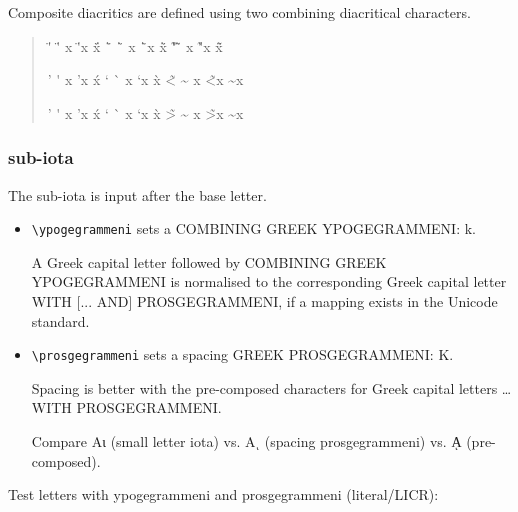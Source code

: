 \documentclass[a4paper]{scrartcl}
\begin{document}
Composite diacritics are defined using two combining diacritical characters.%

\begin{quote}
\accdialytikatonos\textiota{}     \"'\textiota{} \"\'\textiota{}
\accdialytikatonos x              \"'x           \"\'x
\accdialytikavaria\textiota{}     \"`\textiota{} \"\`\textiota{}
\accdialytikavaria x              \"`x           \"\`x
\accdialytikaperispomeni\textiota{} \~"\textiota{} \~\"\textiota{}
\accdialytikaperispomeni x        \~"x           \~\"x

\accdasiaoxia\textiota{}          \<'\textiota{} \<\'\textiota{}
\accdasiaoxia x                   \<'x           \<\'x
\accdasiavaria\textiota{}         \<`\textiota{} \<\`\textiota{}
\accdasiavaria x                  \<`x           \<\`x
\accdasiaperispomeni\textiota{}   \~<\textiota{} \~\<\textiota{}
\accdasiaperispomeni x            \~<x           \~\<x

\accpsilioxia\textiota{}          \>'\textiota{} \>\'\textiota{}
\accpsilioxia x                   \>'x           \>\'x
\accpsilivaria\textiota{}         \>`\textiota{} \>\`\textiota{}
\accpsilivaria x                  \>`x           \>\`x
\accpsiliperispomeni\textiota{}   \~>\textiota{} \~\>\textiota{}
\accpsiliperispomeni x            \~>x           \~\>x
\end{quote}

\subsubsection{sub-iota}

The sub-iota is input after the base letter.

\begin{itemize}
\item
  \verb|\ypogegrammeni| sets a COMBINING GREEK YPOGEGRAMMENI:
  \textalpha\ypogegrammeni{} k\ypogegrammeni{}.

  A Greek capital letter followed by COMBINING GREEK YPOGEGRAMMENI is
  normalised to the corresponding Greek capital letter WITH [... AND]
  PROSGEGRAMMENI, if a mapping exists in the Unicode standard.

\item \verb|\prosgegrammeni| sets a spacing GREEK PROSGEGRAMMENI:
  \textAlpha\prosgegrammeni{} K\prosgegrammeni{}.

  Spacing is better with the pre-composed characters for Greek capital
  letters \ldots{} WITH PROSGEGRAMMENI.

  Compare Αι (small letter iota) vs. Αι (spacing prosgegrammeni) vs. ᾼ
  (pre-composed).


\end{itemize}
%
Test letters with ypogegrammeni and prosgegrammeni (literal/LICR):
\end{document}
